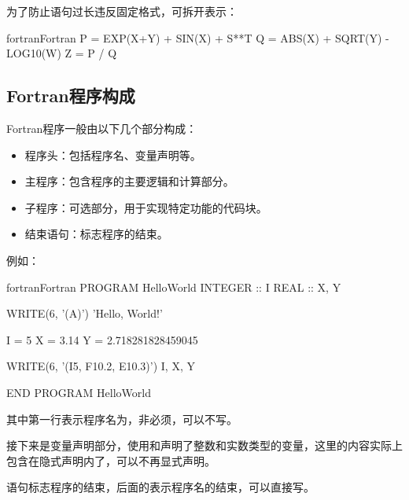 为了防止语句过长违反固定格式，可拆开表示：
\begin{envcode}{fortran}{Fortran}
      P = EXP(X+Y) + SIN(X) + S**T
      Q = ABS(X) + SQRT(Y) - LOG10(W)
      Z = P / Q
\end{envcode}

\subsection{Fortran程序构成}
Fortran程序一般由以下几个部分构成：
\begin{itemize}
      \item 程序头：包括程序名、变量声明等。
      \item 主程序：包含程序的主要逻辑和计算部分。
      \item 子程序：可选部分，用于实现特定功能的代码块。
      \item 结束语句：标志程序的结束。
\end{itemize}
例如：
\begin{envcode}{fortran}{Fortran}
      PROGRAM HelloWorld
      INTEGER :: I
      REAL :: X, Y
      
      WRITE(6, '(A)') 'Hello, World!'
      
      I = 5
      X = 3.14
      Y = 2.718281828459045
      
      WRITE(6, '(I5, F10.2, E10.3)') I, X, Y
      
      END PROGRAM HelloWorld
\end{envcode}

其中第一行表示程序名为，非必须，可以不写。

接下来是变量声明部分，使用和声明了整数和实数类型的变量，这里的内容实际上包含在隐式声明内了，可以不再显式声明。

语句标志程序的结束，后面的表示程序名的结束，可以直接写。


